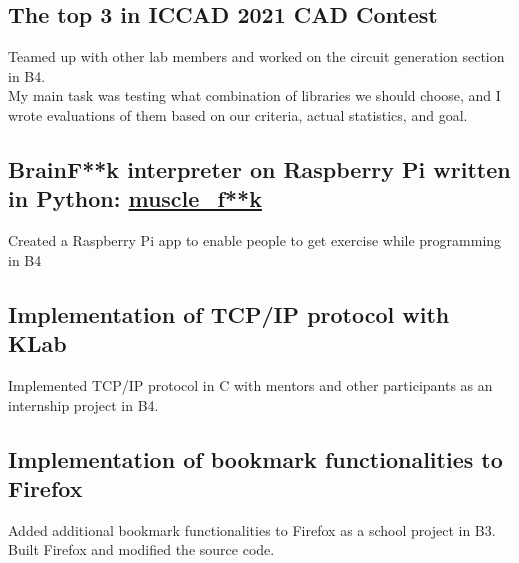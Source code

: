 \documentclass[10pt]{article}
\begin{document}
  \subsection*{The top 3 in ICCAD 2021 CAD Contest}
    Teamed up with other lab members and worked on the circuit generation section in B4.
    \\
    My main task was testing what combination of libraries we should choose, and I wrote evaluations of them based on our criteria, actual statistics, and goal.
  \subsection*{BrainF**k interpreter on Raspberry Pi written in Python: \href{https://github.com/diohabara/muscle_fuck}{muscle\_f**k}}
    Created a Raspberry Pi app to enable people to get exercise while programming in B4
  \subsection*{Implementation of TCP/IP protocol with KLab}
    Implemented TCP/IP protocol in C with mentors and other participants as an internship project in B4.
  \subsection*{Implementation of bookmark functionalities to Firefox}
    Added additional bookmark functionalities to Firefox as a school project in B3.
    \\
    Built Firefox and modified the source code.
\end{document}
